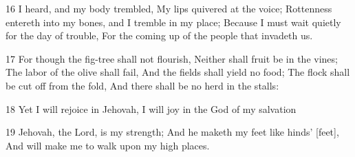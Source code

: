 \par 16 I heard, and my body trembled, My lips quivered at the voice; Rottenness entereth into my bones, and I tremble in my place; Because I must wait quietly for the day of trouble, For the coming up of the people that invadeth us.
\par 17 For though the fig-tree shall not flourish, Neither shall fruit be in the vines; The labor of the olive shall fail, And the fields shall yield no food; The flock shall be cut off from the fold, And there shall be no herd in the stalls:
\par 18 Yet I will rejoice in Jehovah, I will joy in the God of my salvation
\par 19 Jehovah, the Lord, is my strength; And he maketh my feet like hinds' [feet], And will make me to walk upon my high places.

